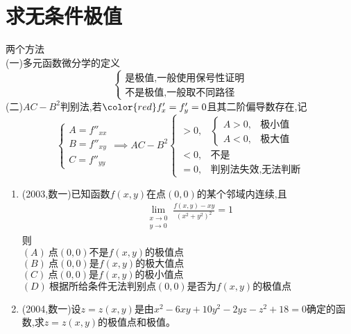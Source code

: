 \documentclass[12pt, a4paper, oneside, UTF8]{ctexbook}
\begin{document}
\section{求无条件极值}
\begin{remark}
    两个方法 \\
    (一)多元函数微分学的定义
    $$
    \begin{cases}
        \text{是极值,一般使用保号性证明} \\
        \text{不是极值,一般取不同路径}
    \end{cases}
    $$
    (二)$AC-B^2$判别法,若$\color{red} f'_x=f'_y=0$且其二阶偏导数存在,记
    $$
    \begin{cases}
        A=f''_{xx} \\
        B=f''_{xy} \\
        C=f''_{yy} 
    \end{cases} \implies AC-B^2\begin{cases}
        > 0, &\begin{cases}
            A > 0, &\text{极小值} \\
            A < 0, &\text{极大值}
        \end{cases} \\
        < 0, &\text{不是} \\
        = 0, &\text{判别法失效,无法判断}
    \end{cases}
    $$
\end{remark}
\begin{enumerate}[label=\arabic*.,start=9]
    \item (2003,数一)已知函数$f(x,y)$在点$(0,0)$的某个邻域内连续,且
    \begin{align*}
        \lim_{\substack{x\to 0\\ y\to 0}}\frac{f(x,y)-xy}{(x^2+y^2)^2}=1
    \end{align*}
    则 \\
    $(A)\ \text{点}(0,0)\text{不是}f(x,y)\text{的极值点}$ \\
    $(B)\ \text{点}(0,0)\text{是}f(x,y)\text{的极大值点}$ \\
    $(C)\ \text{点}(0,0)\text{是}f(x,y)\text{的极小值点}$ \\
    $(D)\ \text{根据所给条件无法判别点}(0,0)\text{是否为}f(x,y)\text{的极值点}$
    
    \begin{solution}
    \newpage
    \end{solution}
    
    \item (2004,数一)设$z=z(x,y)$是由$x^2-6xy+10y^2-2yz-z^2+18=0$确定的函数,求$z=z(x,y)$的极值点和极值。
    
    \begin{solution}
    \newpage
    \end{solution}
\end{enumerate}
\end{document}
